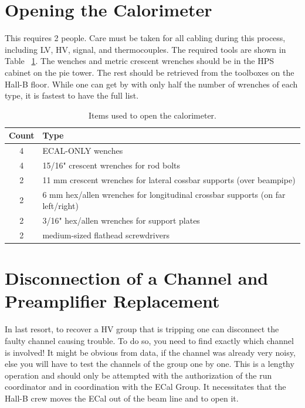 \documentclass[12pt]{article}
\begin{document}
{\newpage
\section{Opening the Calorimeter}

This requires 2 people.  Care must be taken for all cabling during this process, including LV, HV, signal, and thermocouples.  The required tools are shown in Table ~\ref{tab:tools}.  The wenches and metric crescent wrenches should be in the HPS cabinet on the pie tower.  The rest should be retrieved from the toolboxes on the Hall-B floor.  While one can get by with only half the number of wrenches of each type, it is fastest to have the full list. 

\begin{table}[htbp]\centering
    \begin{tabular}{c|l}\hline
        Count & Type \\\hline
4&   ECAL-ONLY wenches\\
4&   15/16" crescent wrenches for rod bolts\\
2&   11 mm crescent wrenches for lateral cossbar supports (over beampipe)\\
2&   6 mm hex/allen wrenches for longitudinal crossbar supports (on far left/right)\\
2&   3/16" hex/allen wrenches for support plates\\
2&   medium-sized flathead screwdrivers\\\hline
    \end{tabular}
    \caption{Items used to open the calorimeter. \label{tab:tools}}
\end{table}

   \section{Disconnection of a Channel and Preamplifier Replacement}
     
      In last resort, to recover a HV group that is tripping one can disconnect the faulty channel causing trouble. To do so, you need to find exactly which channel is involved! It might be obvious from data, if the channel was already very noisy, else you will have to test the channels of the group one by one. This is a lengthy operation and should only be attempted with the authorization of the run coordinator and in coordination with the ECal Group. It necessitates that the Hall-B crew moves the ECal out of the beam line and to open it.

}
\end{document}
